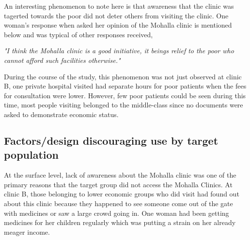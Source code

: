 An interesting phenomenon to note here is that awareness that the clinic was tagerted towards the poor did not deter others from visiting the clinic. One woman's response when asked her opinion of the Mohalla clinic is mentioned below and was typical of other responses received, 

\textit{"I think the Mohalla clinic is a good initiative, it beings relief to the poor who cannot afford such facilities otherwise."}

During the course of the study, this phenomenon was not just observed at clinic B, one private hospital visited had separate hours for poor patients when the fees for consultation were lower. However, few poor patients could be seen during this time, most people visiting belonged to the middle-class since no documents were asked to demonstrate economic status.
\subsection{Factors/design discouraging use by target population} %
At the surface level, lack of awareness about the Mohalla clinic was one of the primary reasons that the target group did not access the Mohalla Clinics. At clinic B, those belonging to lower economic groups who did visit had found out about this clinic because they happened to see someone come out of the gate with medicines or saw a large crowd going in. One woman had been getting medicines for her children regularly which was putting a strain on her already meager income. 

